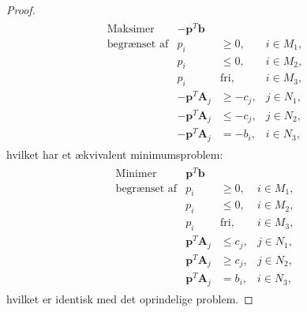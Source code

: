 \begin{proof}
\begin{align*}
\begin{array}{lrll}
\text{Maksimer}		&-\textbf{p}^T\textbf{b}	&			&\\
\text{begrænset af}	&p_i					&\geq 0,	&i \in M_1,\\
					&p_i					&\leq 0,	&i \in M_2,\\
					&p_i					&\text{fri},	&i \in M_3,\\
					&-\textbf{p}^T\textbf{A}_j	&\geq -c_j,	&j \in N_1,\\
					&-\textbf{p}^T\textbf{A}_j	&\leq -c_j,	&j \in N_2,\\
					&-\textbf{p}^T\textbf{A}_j	& = -b_i,	&i \in N_3,
\end{array}
\end{align*}
%
hvilket har et ækvivalent minimumsproblem:
%
\begin{align*}
\begin{array}{lrll}
\text{Minimer}		&\textbf{p}^T\textbf{b}	&			&\\
\text{begrænset af}	&p_i					&\geq 0,	&i \in M_1,\\
					&p_i					&\leq 0,	&i \in M_2,\\
					&p_i					&\text{fri},	&i \in M_3,\\
					&\textbf{p}^T\textbf{A}_j	&\leq c_j,	&j \in N_1,\\
					&\textbf{p}^T\textbf{A}_j	&\geq c_j,	&j \in N_2,\\
					&\textbf{p}^T\textbf{A}_j	& = b_i,	&i \in N_3,
\end{array}
\end{align*}
%
hvilket er identisk med det oprindelige problem. 
%
\end{proof}
%
